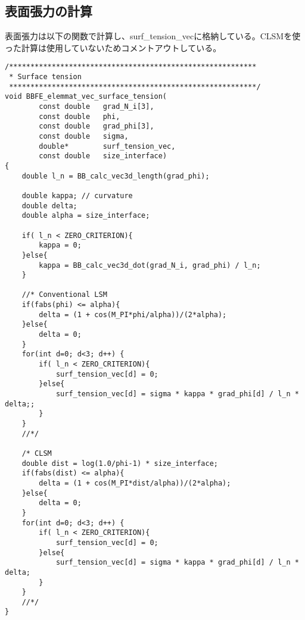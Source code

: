 \subsection{表面張力の計算}
表面張力は以下の関数で計算し、surf\_tension\_vecに格納している。CLSMを使った計算は使用していないためコメントアウトしている。
\begin{lstlisting}[caption = mlflow\_elemmat.cにおける表面張力の計算]
/**********************************************************
 * Surface tension
 **********************************************************/
void BBFE_elemmat_vec_surface_tension(
		const double   grad_N_i[3],
		const double   phi,
		const double   grad_phi[3],
		const double   sigma,
		double*        surf_tension_vec,
		const double   size_interface)
{
	double l_n = BB_calc_vec3d_length(grad_phi);

	double kappa; // curvature
	double delta;
	double alpha = size_interface;

	if( l_n < ZERO_CRITERION){
		kappa = 0;
	}else{
		kappa = BB_calc_vec3d_dot(grad_N_i, grad_phi) / l_n;
	}
	
	//* Conventional LSM
	if(fabs(phi) <= alpha){
		delta = (1 + cos(M_PI*phi/alpha))/(2*alpha);
	}else{
		delta = 0;
	}
	for(int d=0; d<3; d++) {
		if( l_n < ZERO_CRITERION){
			surf_tension_vec[d] = 0;
		}else{
			surf_tension_vec[d] = sigma * kappa * grad_phi[d] / l_n * delta;;
		}
	}
	//*/

	/* CLSM
	double dist = log(1.0/phi-1) * size_interface;
	if(fabs(dist) <= alpha){
		delta = (1 + cos(M_PI*dist/alpha))/(2*alpha);
	}else{
		delta = 0;
	}
	for(int d=0; d<3; d++) {
		if( l_n < ZERO_CRITERION){
			surf_tension_vec[d] = 0;
		}else{
	   		surf_tension_vec[d] = sigma * kappa * grad_phi[d] / l_n * delta;
	   	}
	}
	//*/
}
\end{lstlisting}


